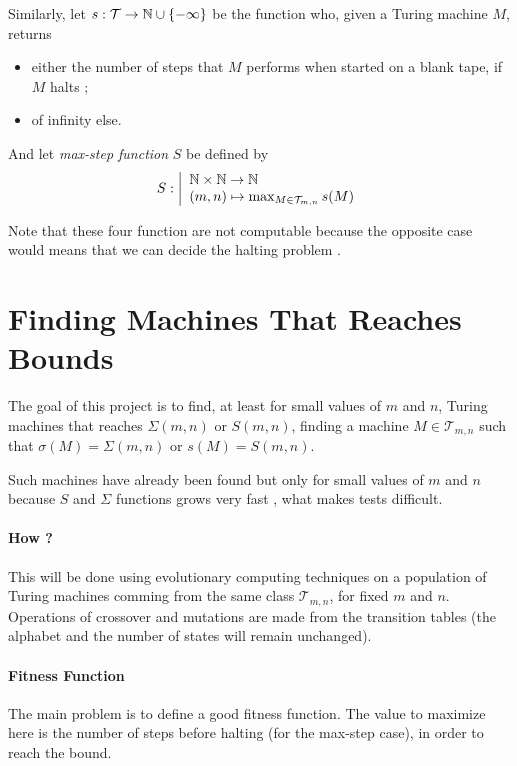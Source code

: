 \documentclass{article}
\begin{document}
Similarly, let $s : \mathcal{T} \to \mathbb{N} \cup \{-\infty\}$ be the function who, given a Turing machine $M$, returns
\begin{itemize}
\item either the number of steps that $M$ performs when started on a blank tape, if $M$ halts ;
\item of infinity else.
\end{itemize}

And let \emph{max-step function} $S$ be defined by
\[
S : \left |
\begin{array}{l}
  \mathbb{N} \times \mathbb{N} \to \mathbb{N}\\
(m,n) \mapsto \max_{M \in \mathcal{T}_{m,n}} s(M)
\end{array}
\right .
\]


Note that these four function are not computable because the opposite case would means that we can decide the halting problem \cite{rado}.


\section{Finding Machines That Reaches Bounds}

The goal of this project is to find, at least for small values of $m$ and $n$, Turing machines that reaches $\Sigma(m,n)$ or $S(m,n)$, \ie finding a machine $M \in \mathcal{T}_{m,n}$ such that $\sigma(M) = \Sigma(m,n)$ or $s(M) = S(m,n)$.

Such machines have already been found \cite{rado} but only for small values of $m$ and $n$ because $S$ and $\Sigma$ functions grows very fast \cite{rado}, what makes tests difficult.


\paragraph{How ?} This will be done using evolutionary computing techniques on a population of Turing machines comming from the same class $\mathcal{T}_{m,n}$, for fixed $m$ and $n$. Operations of crossover and mutations are made from the transition tables (the alphabet and the number of states will remain unchanged).

\paragraph{Fitness Function}
The main problem is to define a good fitness function. The value to maximize here is the number of steps before halting (for the max-step case), in order to reach the bound.
\end{document}
